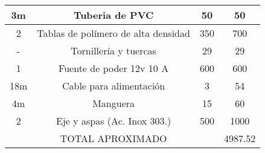 \documentclass[11pt,letter
								]
								{article}
\begin{document}
\begin{table}[H]
\begin{center}
\begin{tabular}{||c c c c||}
\hline
3m & Tuberia de PVC  & 50 &50 \\ 
\hline
 2 & Tablas de polímero de alta densidad &350 &700 \\ 
\hline

 - & Tornillería y tuercas   &  29&29 \\ 
\hline
 1 & Fuente de poder 12v 10 A   &600 &600 \\ 
\hline
 18m  & Cable para alimentación    &3 &54 \\ 
\hline
 4m  & Manguera    & 15&60 \\ 
\hline
 2  & Eje y aspas (Ac. Inox 303.)    & 500 &1000 \\ 
\hline
   & TOTAL APROXIMADO &  &4987.52 \\ 



 \hline\hline

\end{tabular}
\end{center}

\end{table}
\newpage




	
	
	





											
\end{document}
